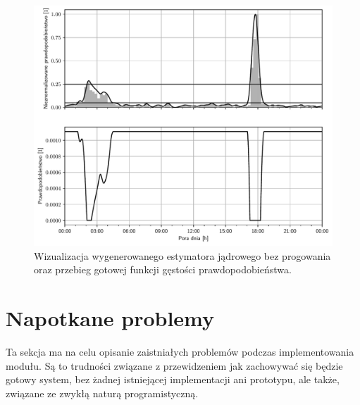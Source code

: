 \begin{figure}
    \centering\includegraphics[width=1.00\textwidth]{img/transformation.pdf}
    \caption{Wizualizacja wygenerowanego estymatora jądrowego bez progowania oraz przebieg gotowej funkcji gęstości prawdopodobieństwa.} \label{fig:transform}
\end{figure}

\section{Napotkane problemy}
Ta sekcja ma na celu opisanie zaistniałych problemów podczas implementowania modułu. Są to trudności związane z przewidzeniem jak zachowywać się będzie gotowy system, bez żadnej istniejącej implementacji ani prototypu, ale także, związane ze zwykłą naturą programistyczną.

